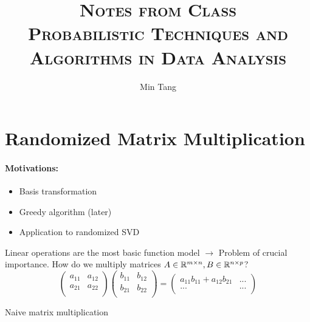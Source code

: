 
\title{\scshape Notes from Class \vspace{0.5pc} \\ \large{Probabilistic Techniques and Algorithms in Data Analysis}}
\author{Min Tang}

\setcounter{section}{1}
\setcounter{page}{2}
\section{Randomized Matrix Multiplication}
\paragraph{Motivations:}
\begin{itemize}
\item Basis transformation
\item Greedy algorithm (later)
\item Application to randomized SVD
\end{itemize}
Linear operations are the most basic function model $\rightarrow$ Problem of crucial importance. How do we multiply matrices $A\in \mathbb{R}^{m\times n}, B\in \mathbb{R}^{n\times p}$?
\begin{equation*}
\begin{pmatrix}
a_{11} & a_{12} \\
a_{21} & a_{22} \\
\end{pmatrix}
\begin{pmatrix}
b_{11} & b_{12} \\
b_{21} & b_{22} \\
\end{pmatrix} =
\begin{pmatrix}
a_{11} b_{11} + a_{12} b_{21} & ... \\
... & ... \\
\end{pmatrix}
\end{equation*}
\begin{algorithm}[H]
\caption{Naive matrix multiplication}
\end{algorithm}
